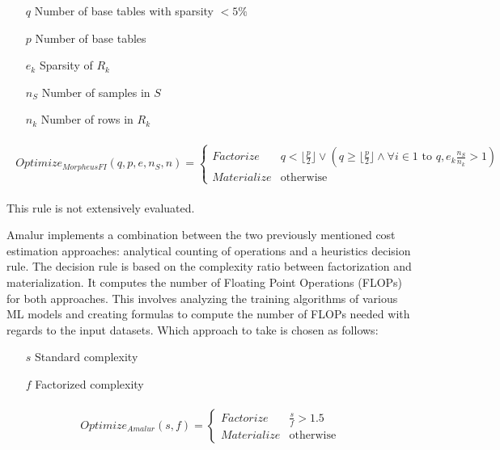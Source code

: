\begin{definition} 

\begin{itemize}
    \item[]
    \item[$q$]Number of base tables with sparsity $ < 5\% $
    \item[$p$] Number of base tables
    \item[$e_k$] Sparsity of $R_k$
    \item[$n_S$] Number of samples in $S$
    \item[$n_k$] Number of rows in $R_k$
\end{itemize}

\small{
		\begin{align*}
			\begin{split} 
Optimize_{MorpheusFI}(q, p, e, n_S, n) =  \begin{cases}Factorize &q < \lfloor \frac{p}{2} \rfloor \vee ( q \geq \lfloor \frac{p}{2} \rfloor \wedge \forall i \in 1 \text{ to } q, e_k \frac{n_S}{n_k} > 1) \\Materialize & \text{otherwise}\end{cases}
			\end{split}
		\end{align*}
	}
\end{definition}
This rule is not extensively evaluated.

Amalur \cite{schijndel_cost_estimation} implements a combination between the two previously mentioned cost estimation approaches: analytical counting of operations and a heuristics decision rule. The decision rule is based on the complexity ratio between factorization and materialization. It computes the number of Floating Point Operations (FLOPs) for both approaches. This involves analyzing the training algorithms of various ML models and creating formulas to compute the number of FLOPs needed with regards to the input datasets. Which approach to take is chosen as follows:

\begin{definition} 

\begin{itemize}
    \item[]
    \item[$s$] Standard complexity
    \item[$f$] Factorized complexity
\end{itemize}

\small{
		\begin{align*}
			\begin{split} 
Optimize_{Amalur}(s, f) =  \begin{cases}Factorize&\frac{s}{f} > 1.5 \\Materialize & \text{otherwise}\end{cases}
			\end{split}
		\end{align*}
	}
\end{definition}

